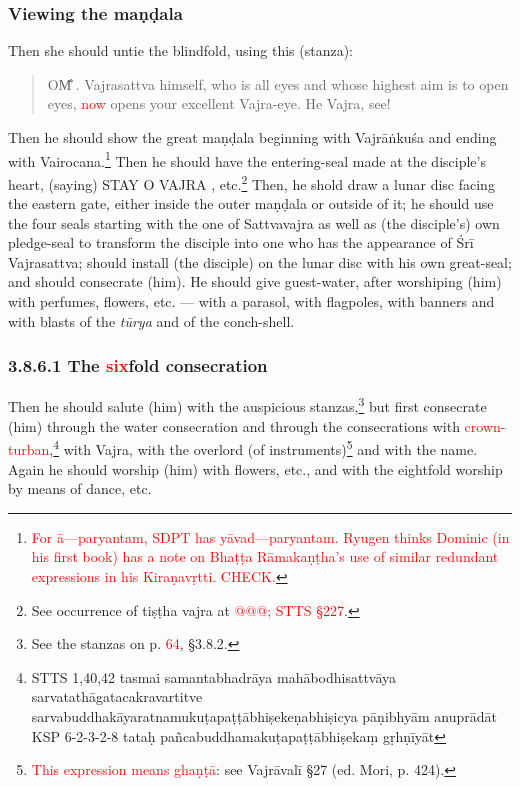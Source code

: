 \documentclass[11pt]{book}
\makeatletter
\def\fakesc#1{%
  \begingroup%
  \xdef\fake@name{\csname\curr@fontshape/\f@size\endcsname}%
  \fontsize{1.3\fontdimen8\fake@name}{\baselineskip}\selectfont%
  \uppercase{#1}%
  \endgroup%
}
\newcommand{\mantra}[1]{\fakesc{#1}}
\newcommand{\red}[1]{\textcolor{red}{#1}}
\makeatother
\begin{document}
\subsubsection{Viewing the maṇḍala}

Then she should untie the blindfold, using this (stanza):

\begin{verse}
\mantra{Om̐}. Vajrasattva himself, who is all eyes and whose highest aim is to open eyes, \red{now} opens your excellent Vajra-eye. He Vajra, see!
\end{verse}

Then he should show the great maṇḍala beginning with Vajrāṅkuśa and ending with Vairocana.\footnote{\red{For ā---paryantam, SDPT has yāvad---paryantam. Ryugen thinks Dominic (in his first book) has a note on Bhaṭṭa Rāmakaṇṭha's use of similar redundant expressions in his Kiraṇavṛtti. CHECK.}} Then he should have the entering-seal made at the disciple's heart, (saying) \mantra{stay o vajra}, etc.\footnote{See occurrence of tiṣṭha vajra at \red{@@@; STTS §227}.} Then, he shold draw a lunar disc facing the eastern gate, either inside the outer maṇḍala or outside of it; he should use the four seals starting with the one of Sattvavajra as well as (the disciple's) own pledge-seal to transform the disciple into one who has the appearance of Śrī Vajrasattva; should install (the disciple) on the lunar disc with his own great-seal; and should consecrate (him). He should give guest-water, after worshiping (him) with perfumes, flowers, etc. --- with a parasol, with flagpoles, with banners and with blasts of the \emph{tūrya} and of the conch-shell.

\subsubsection{3.8.6.1 The \red{six}fold consecration}

Then he should salute (him) with the auspicious stanzas,\footnote{See the stanzas on p. \red{64}, §3.8.2.} but first consecrate (him) through the water consecration and through the consecrations with \red{crown-turban},\footnote{
STTS 1,40,42 tasmai samantabhadrāya mahābodhisattvāya sarvatathāgatacakravartitve sarvabuddhakāyaratnamukuṭapaṭṭābhiṣekeṇabhiṣicya pāṇibhyām anuprādāt
KSP 6-2-3-2-8 tataḥ pañcabuddhamakuṭapaṭṭābhiṣekaṃ gṛhṇīyāt} with Vajra, with the overlord (of  instruments)\footnote{\red{This expression means ghaṇṭā}: see Vajrāvalī §27 (ed. Mori, p. 424).} and with the name. Again he should worship (him) with flowers, etc., and with the eightfold worship by means of dance, etc.
\end{document}
